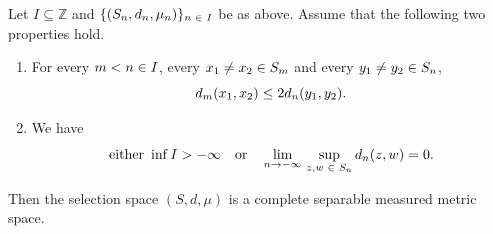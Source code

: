 \documentclass[AHL,Unicode]{cedram}
\newcommand*\z{\mathbb{Z}}
\let\originalleft\left
\let\originalright\right
\renewcommand{\left}{\mathopen{}\mathclose\bgroup\originalleft}
\renewcommand{\right}{\aftergroup\egroup\originalright}
\renewcommand*{\to}{\mathchoice{\longrightarrow}{\rightarrow}{\rightarrow}{\rightarrow}}
\let\oldin\in
\renewcommand{\in}{\mathchoice{\oldin}{\oldin}{\,\oldin\,}{\,\oldin\,}}
\begin{document}
\begin{prop}\label{prop:selection_space_properties}
Let $I\subseteq\z$ and $\{ (S_{n},d_{n},\mu_{n})\} _{n\in I}$ be as above. Assume that the following two properties hold.
\begin{enumerate}
\item\label{prop2.2.1} For every $m<n\in I$, every $x_{1}\neq x_{2}\in S_{m}$ and every $y_{1}\neq y_{2}\in S_{n}$,
\begin{equation}\label{eq:metrics_are_subadditive_assumption}
d_{m}\left(x_{1},x_{2}\right)\leq2d_{n}\left(y_{1},y_{2}\right).
\end{equation}
\item\label{prop2.2.2} We have
\begin{equation}\label{eq:assumption_separability}
\text{either }
\inf I>-\infty\quad
\text{or}\quad
\lim_{n\to-\infty}\,\sup_{z,w\in S_{n}}d_{n}\left(z,w\right)=0.
\end{equation}
\end{enumerate}
Then the selection space $(S,d,\mu)$ is a complete separable measured metric space.
\end{prop}
\end{document}
